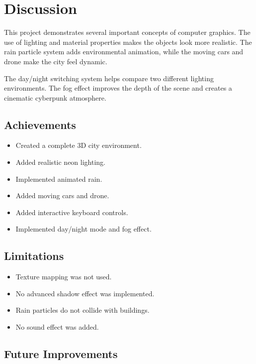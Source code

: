 \documentclass[12pt,a4paper]{report}
\begin{document}
\chapter{Discussion}

This project demonstrates several important concepts of computer graphics. The use of lighting and material properties makes the objects look more realistic. The rain particle system adds environmental animation, while the moving cars and drone make the city feel dynamic.

The day/night switching system helps compare two different lighting environments. The fog effect improves the depth of the scene and creates a cinematic cyberpunk atmosphere.

\section{Achievements}

\begin{itemize}
    \item Created a complete 3D city environment.
    \item Added realistic neon lighting.
    \item Implemented animated rain.
    \item Added moving cars and drone.
    \item Added interactive keyboard controls.
    \item Implemented day/night mode and fog effect.
\end{itemize}

\section{Limitations}

\begin{itemize}
    \item Texture mapping was not used.
    \item No advanced shadow effect was implemented.
    \item Rain particles do not collide with buildings.
    \item No sound effect was added.
\end{itemize}

\section{Future Improvements}
\end{document}
